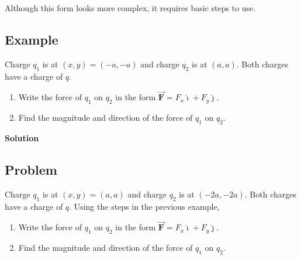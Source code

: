 \documentclass{article}
\newcommand{\ihat}[0]{\hat{\boldsymbol{\imath}}}
\newcommand{\jhat}[0]{\hat{\boldsymbol{\jmath}}}
\newcommand{\bfvec}[1]{\vec{\mathbf{#1}}}
\begin{document}
Although this form looks more complex, it requires basic steps to use.

\subsection{Example}

Charge $q_1$ is at $(x,y)=(-a,-a)$ and charge $q_2$ is at $(a, a)$. Both charges have a charge of $q$.

\begin{enumerate}

  \item Write the force of $q_1$ on $q_2$ in the form $\bfvec{F}=F_x\ihat + F_y\jhat$.

  \item Find the magnitude and direction of the force of $q_1$ on $q_2$.

\end{enumerate}

\ifsolutions
  \textbf{Solution}

\fi

\subsection{Problem}

Charge $q_1$ is at $(x,y)=(a,a)$ and charge $q_2$ is at $(-2a, -2a)$. Both charges have a charge of $q$. Using the steps in the previous example,

\begin{enumerate}

  \item Write the force of $q_1$ on $q_2$ in the form $\bfvec{F}=F_x\ihat + F_y\jhat$.

  \item Find the magnitude and direction of the force of $q_1$ on $q_2$.

\end{enumerate}
\end{document}
